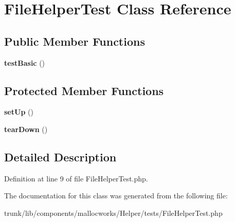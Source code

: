 \hypertarget{class_file_helper_test}{
\section{FileHelperTest Class Reference}
\label{class_file_helper_test}
}
\subsection*{Public Member Functions}
\begin{DoxyCompactItemize}
\item 
\hypertarget{class_file_helper_test_a43130cb481135ee931f1562a1503378a}{
{\bfseries testBasic} ()}
\label{class_file_helper_test_a43130cb481135ee931f1562a1503378a}

\end{DoxyCompactItemize}
\subsection*{Protected Member Functions}
\begin{DoxyCompactItemize}
\item 
\hypertarget{class_file_helper_test_a0bc688732d2b3b162ffebaf7812e78da}{
{\bfseries setUp} ()}
\label{class_file_helper_test_a0bc688732d2b3b162ffebaf7812e78da}

\item 
\hypertarget{class_file_helper_test_a80fe3d17e658907fc75346a0ec9d6fc7}{
{\bfseries tearDown} ()}
\label{class_file_helper_test_a80fe3d17e658907fc75346a0ec9d6fc7}

\end{DoxyCompactItemize}


\subsection{Detailed Description}


Definition at line 9 of file FileHelperTest.php.



The documentation for this class was generated from the following file:\begin{DoxyCompactItemize}
\item 
trunk/lib/components/mallocworks/Helper/tests/FileHelperTest.php\end{DoxyCompactItemize}
